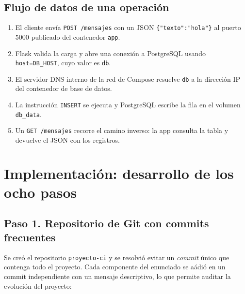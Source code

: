 \documentclass[12pt,a4paper]{article}
\begin{document}
\subsection{Flujo de datos de una operaci\'on}

\begin{enumerate}
  \item El cliente env\'ia \texttt{POST /mensajes} con un JSON \texttt{\{"texto":"hola"\}} al
        puerto 5000 publicado del contenedor \texttt{app}.
  \item Flask valida la carga y abre una conexi\'on a PostgreSQL usando
        \texttt{host=DB\_HOST}, cuyo valor es \texttt{db}.
  \item El servidor DNS interno de la red de Compose resuelve \texttt{db} a la direcci\'on
        IP del contenedor de base de datos.
  \item La instrucci\'on \texttt{INSERT} se ejecuta y PostgreSQL escribe la fila en el
        volumen \texttt{db\_data}.
  \item Un \texttt{GET /mensajes} recorre el camino inverso: la app consulta la tabla y
        devuelve el JSON con los registros.
\end{enumerate}

\section{Implementaci\'on: desarrollo de los ocho pasos}

\subsection{Paso 1. Repositorio de Git con commits frecuentes}

Se cre\'o el repositorio \texttt{proyecto-ci} y se resolvi\'o evitar un \emph{commit} \'unico
que contenga todo el proyecto. Cada componente del enunciado se a\'adi\'o en un commit
independiente con un mensaje descriptivo, lo que permite auditar la evoluci\'on del
proyecto:
\end{document}

